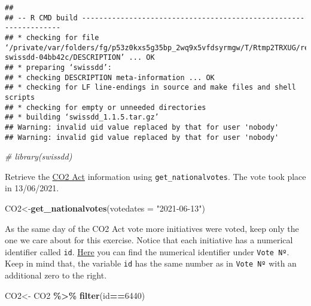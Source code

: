 \documentclass[
]{book}
\newenvironment{Shaded}{\begin{snugshade}}{\end{snugshade}}
\newcommand{\AttributeTok}[1]{\textcolor[rgb]{0.13,0.29,0.53}{#1}}
\newcommand{\CommentTok}[1]{\textcolor[rgb]{0.56,0.35,0.01}{\textit{#1}}}
\newcommand{\DecValTok}[1]{\textcolor[rgb]{0.00,0.00,0.81}{#1}}
\newcommand{\FunctionTok}[1]{\textcolor[rgb]{0.13,0.29,0.53}{\textbf{#1}}}
\newcommand{\NormalTok}[1]{#1}
\newcommand{\OtherTok}[1]{\textcolor[rgb]{0.56,0.35,0.01}{#1}}
\newcommand{\SpecialCharTok}[1]{\textcolor[rgb]{0.81,0.36,0.00}{\textbf{#1}}}
\newcommand{\StringTok}[1]{\textcolor[rgb]{0.31,0.60,0.02}{#1}}
\begin{document}
\begin{verbatim}
## 
## -- R CMD build -----------------------------------------------------------------
## * checking for file ‘/private/var/folders/fg/p53z0kxs5g35bp_2wq9x5vfdsyrmgw/T/Rtmp2TRXUG/remotesc8d81ec6ad96/politanch-swissdd-04bb42c/DESCRIPTION’ ... OK
## * preparing ‘swissdd’:
## * checking DESCRIPTION meta-information ... OK
## * checking for LF line-endings in source and make files and shell scripts
## * checking for empty or unneeded directories
## * building ‘swissdd_1.1.5.tar.gz’
## Warning: invalid uid value replaced by that for user 'nobody'
## Warning: invalid gid value replaced by that for user 'nobody'
\end{verbatim}

\begin{Shaded}
\begin{Highlighting}[]
\CommentTok{\# library(swissdd)}
\end{Highlighting}
\end{Shaded}

Retrieve the \href{https://swissvotes.ch/vote/644.00}{CO2 Act} information using \texttt{get\_nationalvotes}. The vote took place in 13/06/2021.

\begin{Shaded}
\begin{Highlighting}[]
\NormalTok{CO2}\OtherTok{\textless{}{-}}\FunctionTok{get\_nationalvotes}\NormalTok{(}\AttributeTok{votedates =} \StringTok{"2021{-}06{-}13"}\NormalTok{)}
\end{Highlighting}
\end{Shaded}

As the same day of the CO2 Act vote more initiatives were voted, keep only the one we care about for this exercise. Notice that each initiative has a numerical identifier called \texttt{id}. \href{https://swissvotes.ch/vote/644.00}{Here} you can find the numerical identifier under \texttt{Vote\ Nº}. Keep in mind that, the variable \texttt{id} has the same number as in \texttt{Vote\ Nº} with an additional zero to the right.

\begin{Shaded}
\begin{Highlighting}[]
\NormalTok{CO2}\OtherTok{\textless{}{-}}\NormalTok{ CO2 }\SpecialCharTok{\%\textgreater{}\%}
  \FunctionTok{filter}\NormalTok{(id}\SpecialCharTok{==}\DecValTok{6440}\NormalTok{)}
\end{Highlighting}
\end{Shaded}
\end{document}

